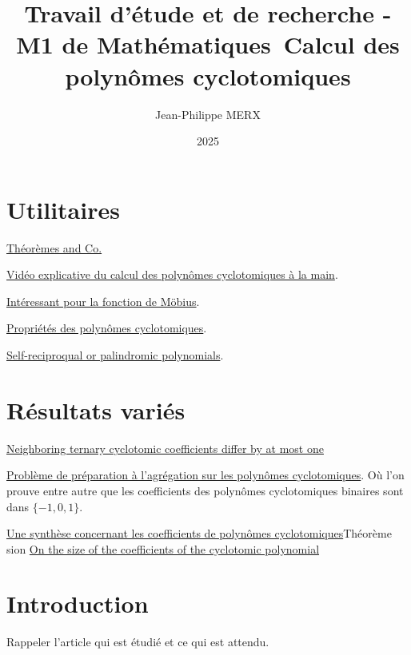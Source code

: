 \documentclass{article}
\newcounter{question}
\theoremstyle{break}                  %
\begin{document}
\lstset{language=python}

\title{Travail d'étude et de recherche - M1 de Mathématiques\
Calcul des polynômes cyclotomiques}
\author{Jean-Philippe MERX}
\date{2025}

\maketitle

\section*{Utilitaires}
\href{https://tex.stackexchange.com/questions/204411/getting-examples-to-look-like-theorems-lemmas-corollaries}{Théorèmes and Co.}


\href{https://www.youtube.com/watch?v=RLdHp_PB_x0}{Vidéo explicative du calcul des polynômes cyclotomiques à la main}.

\href{https://www.youtube.com/watch?v=gnBbm78jz0Y}{Intéressant pour la fonction de Möbius}.

\href{https://jacquescellier.fr/maths/polynomes_cyclotomiques.pdf}{Propriétés des polynômes cyclotomiques}.

\href{https://en.wikipedia.org/wiki/Reciprocal_polynomial}{Self-reciproqual or palindromic polynomials}.

\section*{Résultats variés}
\href{https://arxiv.org/pdf/0810.5496}{Neighboring ternary cyclotomic coefficients differ by at most one}

\href{https://webusers.imj-prg.fr/~pierre.charollois/Charollois_Pbme_cyclotomiques_agreg2015.pdf}{Problème de préparation à l'agrégation sur les polynômes cyclotomiques}. Où l'on prouve entre autre que les coefficients des polynômes cyclotomiques binaires sont dans $\{-1, 0, 1\}$.

\href{https://arxiv.org/pdf/2111.04034}{Une synthèse concernant les coefficients de polynômes cyclotomiques}Théorème
sion
\href{https://math.dartmouth.edu/~carlp/cyclo.pdf}{On the size of the coefficients of the cyclotomic polynomial}


\section*{Introduction}
Rappeler l'article qui est étudié et ce qui est attendu.
\end{document}

